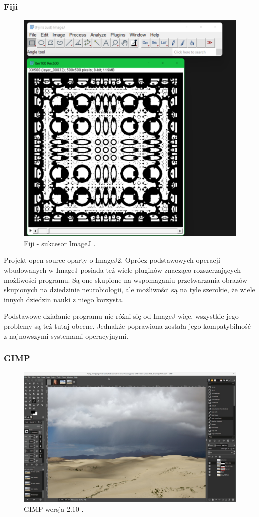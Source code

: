\subsubsection{Fiji}
\begin{figure}[H]
    \centering
    \includegraphics[width=0.8\linewidth]{./images/Picture4.png}
    \caption{Fiji - sukcesor ImageJ \cite{fiji}.}
    \label{fig:fiji}
\end{figure}

Projekt open source oparty o ImageJ2. Oprócz podstawowych operacji wbudowanych w ImageJ posiada też wiele pluginów znacząco rozszerzających możliwości programu. 
Są one skupione na wspomaganiu przetwarzania obrazów skupionych na dziedzinie neurobiologii, ale możliwości są na tyle szerokie, że wiele innych dziedzin nauki z niego korzysta.

Podstawowe działanie programu nie różni się od ImageJ więc, wszystkie jego problemy są też tutaj obecne. Jednakże poprawiona została jego kompatybilność z najnowszymi systemami operacyjnymi.

\subsubsection{GIMP}
\begin{figure}[H]
    \centering
    \includegraphics{./images/Picture5.jpg}
    \caption{GIMP wersja 2.10 \cite{gimp}.}
    \label{fig:gimp}
\end{figure}

